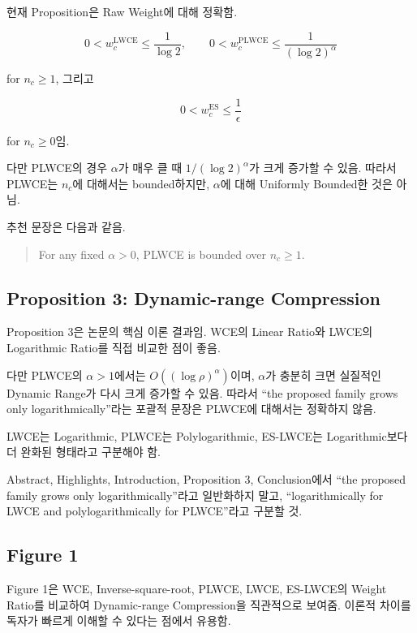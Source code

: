 \documentclass[11pt,a4paper]{article}
\begin{document}
현재 Proposition은 Raw Weight에 대해 정확함.

\[
0<w_c^{\mathrm{LWCE}}\leq \frac{1}{\log 2},
\qquad
0<w_c^{\mathrm{PLWCE}}\leq \frac{1}{(\log 2)^\alpha}
\]

for \(n_c\geq1\), 그리고

\[
0<w_c^{\mathrm{ES}}\leq \frac{1}{\epsilon}
\]

for \(n_c\geq0\)임.

다만 PLWCE의 경우 \(\alpha\)가 매우 클 때 \(1/(\log2)^\alpha\)가 크게 증가할 수 있음. 따라서 PLWCE는 \(n_c\)에 대해서는 bounded하지만, \(\alpha\)에 대해 Uniformly Bounded한 것은 아님.

추천 문장은 다음과 같음.

\begin{quote}
For any fixed \(\alpha>0\), PLWCE is bounded over \(n_c\geq1\).
\end{quote}

\subsection{Proposition 3: Dynamic-range Compression}

Proposition 3은 논문의 핵심 이론 결과임. WCE의 Linear Ratio와 LWCE의 Logarithmic Ratio를 직접 비교한 점이 좋음.

다만 PLWCE의 \(\alpha>1\)에서는 \(O((\log\rho)^\alpha)\)이며, \(\alpha\)가 충분히 크면 실질적인 Dynamic Range가 다시 크게 증가할 수 있음. 따라서 ``the proposed family grows only logarithmically''라는 포괄적 문장은 PLWCE에 대해서는 정확하지 않음.

LWCE는 Logarithmic, PLWCE는 Polylogarithmic, ES-LWCE는 Logarithmic보다 더 완화된 형태라고 구분해야 함.

\begin{tcolorbox}[title=수정 권장]
Abstract, Highlights, Introduction, Proposition 3, Conclusion에서 ``the proposed family grows only logarithmically''라고 일반화하지 말고, ``logarithmically for LWCE and polylogarithmically for PLWCE''라고 구분할 것.
\end{tcolorbox}

\subsection{Figure 1}

Figure 1은 WCE, Inverse-square-root, PLWCE, LWCE, ES-LWCE의 Weight Ratio를 비교하여 Dynamic-range Compression을 직관적으로 보여줌. 이론적 차이를 독자가 빠르게 이해할 수 있다는 점에서 유용함.
\end{document}

